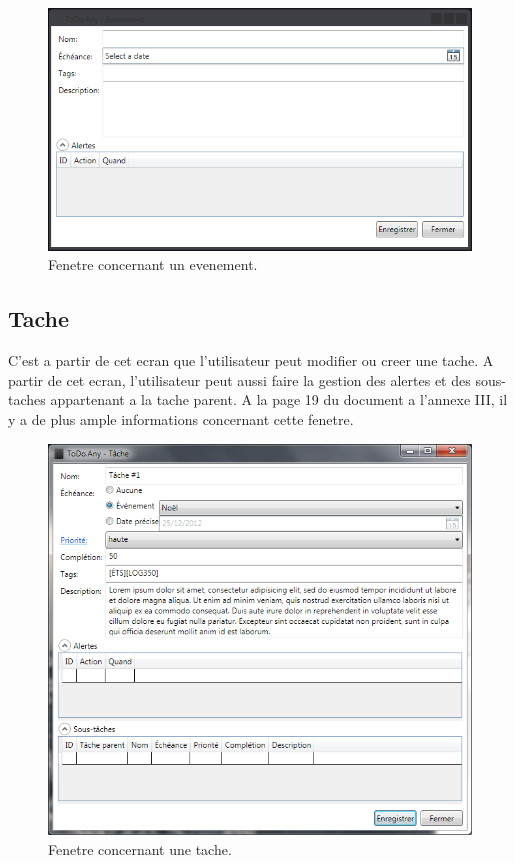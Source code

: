 \documentclass[letterpaper, oneside, 12pt, these, creativecommons]{thETS}
\begin{document}
\begin{figure}[H!]
	\centering
	\includegraphics[width=1\textwidth]{fenetre_evenement.png}
	\caption{Fenetre concernant un evenement.}
\end{figure}

\newpage

\subsection{Tache}

C'est a partir de cet ecran que l'utilisateur peut modifier ou creer une tache. A partir de cet ecran, l'utilisateur peut aussi faire la gestion des alertes et des sous-taches appartenant a la tache parent. A la page 19 du document a l'annexe III, il y a de plus ample informations concernant cette fenetre.

\begin{figure}[H!]
	\centering
	\includegraphics[width=1\textwidth]{fenetre_tache.png}
	\caption{Fenetre concernant une tache.}
\end{figure}
\end{document}
